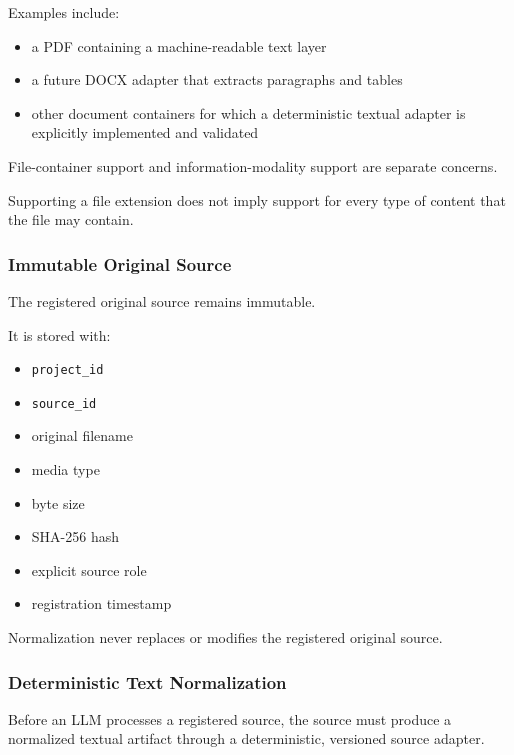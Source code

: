 Examples include:

\begin{itemize}
\tightlist
\item
  a PDF containing a machine-readable text layer
\item
  a future DOCX adapter that extracts paragraphs and tables
\item
  other document containers for which a deterministic textual adapter is explicitly implemented and validated
\end{itemize}

File-container support and information-modality support are separate concerns.

Supporting a file extension does not imply support for every type of content that the file may contain.

\hypertarget{immutable-original-source}{%
\subsubsection{Immutable Original Source}\label{immutable-original-source}}

The registered original source remains immutable.

It is stored with:

\begin{itemize}
\tightlist
\item
  \texttt{project\_id}
\item
  \texttt{source\_id}
\item
  original filename
\item
  media type
\item
  byte size
\item
  SHA-256 hash
\item
  explicit source role
\item
  registration timestamp
\end{itemize}

Normalization never replaces or modifies the registered original source.

\hypertarget{deterministic-text-normalization}{%
\subsubsection{Deterministic Text Normalization}\label{deterministic-text-normalization}}

Before an LLM processes a registered source, the source must produce a normalized textual artifact through a deterministic, versioned source adapter.

